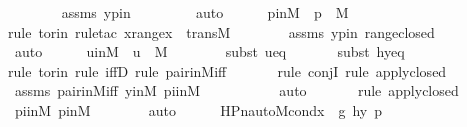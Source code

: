 \begin{isabellebody}
\ \ \ \ \ \ \isamarkupfalse%
\ assms{}\ ypin\ \isanewline
\ \ \ \ \ \ \isamarkupfalse%
\ auto\isanewline
\isanewline
\ \ \ \ \isamarkupfalse%
\ pinM\ {\isacharcolon}{\kern0pt}\ {\isachardoublequoteopen}p\ {\isasymin}\ M{\isachardoublequoteclose}\ \isanewline
\ \ \ \ \ \ \isamarkupfalse%
{\isacharparenleft}{\kern0pt}rule\ to{\isacharunderscore}{\kern0pt}rin{\isacharcomma}{\kern0pt}\ rule{\isacharunderscore}{\kern0pt}tac\ x{\isacharequal}{\kern0pt}{\isachardoublequoteopen}range{\isacharparenleft}{\kern0pt}x{\isacharparenright}{\kern0pt}{\isachardoublequoteclose}\ \ transM{\isacharparenright}{\kern0pt}\isanewline
\ \ \ \ \ \ \isamarkupfalse%
\ assms{}\ ypin\ range{\isacharunderscore}{\kern0pt}closed\ \isanewline
\ \ \ \ \ \ \isamarkupfalse%
\ auto\isanewline
\isanewline
\ \ \ \ \isamarkupfalse%
\ uinM\ {\isacharcolon}{\kern0pt}\ {\isachardoublequoteopen}u\ {\isasymin}\ M{\isachardoublequoteclose}\ \isanewline
\ \ \ \ \ \ \isamarkupfalse%
{\isacharparenleft}{\kern0pt}subst\ ueq{\isacharparenright}{\kern0pt}\isanewline
\ \ \ \ \ \ \isamarkupfalse%
{\isacharparenleft}{\kern0pt}subst\ hyeq{\isacharparenright}{\kern0pt}\isanewline
\ \ \ \ \ \ \isamarkupfalse%
{\isacharparenleft}{\kern0pt}rule\ to{\isacharunderscore}{\kern0pt}rin{\isacharcomma}{\kern0pt}\ rule\ iffD{}{\isacharcomma}{\kern0pt}\ rule\ pair{\isacharunderscore}{\kern0pt}in{\isacharunderscore}{\kern0pt}M{\isacharunderscore}{\kern0pt}iff{\isacharparenright}{\kern0pt}\isanewline
\ \ \ \ \ \ \isamarkupfalse%
{\isacharparenleft}{\kern0pt}rule\ conjI{\isacharcomma}{\kern0pt}\ rule\ apply{\isacharunderscore}{\kern0pt}closed{\isacharparenright}{\kern0pt}\isanewline
\ \ \ \ \ \ \isamarkupfalse%
\ assms{}\ pair{\isacharunderscore}{\kern0pt}in{\isacharunderscore}{\kern0pt}M{\isacharunderscore}{\kern0pt}iff\ yinM\ piinM\ \isanewline
\ \ \ \ \ \ \ \ \isamarkupfalse%
\ auto{\isacharbrackleft}{\kern0pt}{}{\isacharbrackright}{\kern0pt}\isanewline
\ \ \ \ \ \ \isamarkupfalse%
{\isacharparenleft}{\kern0pt}rule\ apply{\isacharunderscore}{\kern0pt}closed{\isacharparenright}{\kern0pt}\isanewline
\ \ \ \ \ \ \isamarkupfalse%
\ piinM\ pinM\isanewline
\ \ \ \ \ \ \isamarkupfalse%
\ auto\isanewline
\isanewline
\ \ \ \ \isamarkupfalse%
\ {\isachardoublequoteopen}HPn{\isacharunderscore}{\kern0pt}auto{\isacharunderscore}{\kern0pt}M{\isacharunderscore}{\kern0pt}cond{\isacharparenleft}{\kern0pt}{\isacharless}{\kern0pt}x{\isacharcomma}{\kern0pt}\ {\isasympi}{\isachargreater}{\kern0pt}{\isacharcomma}{\kern0pt}\ g{\isacharcomma}{\kern0pt}\ {\isacharless}{\kern0pt}h{\isacharbackquote}{\kern0pt}y{\isacharcomma}{\kern0pt}\ {\isasympi}{\isacharbackquote}{\kern0pt}p{\isachargreater}{\kern0pt}{\isacharparenright}{\kern0pt}{\isachardoublequoteclose}\ \isanewline

\end{isabellebody}
